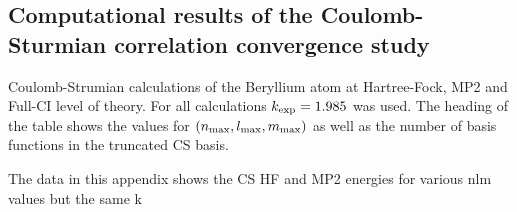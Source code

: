 \begin{appendix}
\chapter{Computational results of the Coulomb-Sturmian correlation convergence study}
\label{apx:CSCorrelationConvergence}


\begin{table}
	\centering
	
	\caption{Coulomb-Strumian calculations of the Beryllium atom
		at Hartree-Fock, MP2 and Full-CI level of theory.
		For all calculations $k_\text{exp} = 1.985$ was used.
		The heading of the table shows the values for
		$(n_\text{max}, l_\text{max}, m_\text{max})$ as well as the
		number of basis functions
		in the truncated CS basis.}
	\label{tab:CStruncationEnergies}
\end{table}


The data in this appendix shows the CS HF and MP2 energies
for various nlm values but the same k



















\end{appendix}
